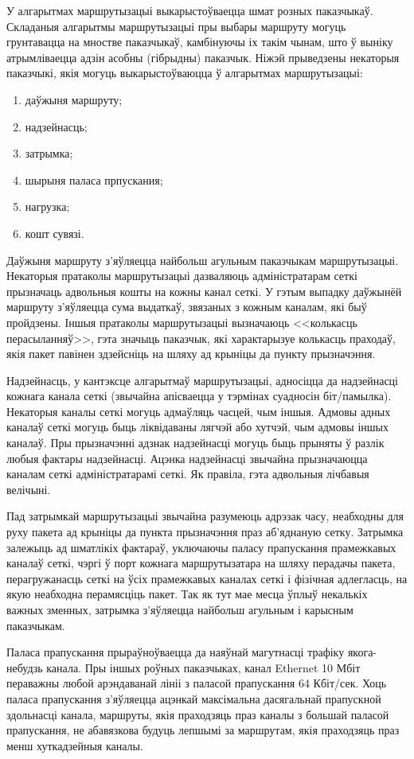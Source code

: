У алгарытмах маршрутызацыі выкарыстоўваецца шмат розных паказчыкаў. Складаныя алгарытмы маршрутызацыі пры выбары маршруту могуць грунтавацца на мностве паказчыкаў, камбінуючы іх такім чынам, што ў выніку атрымліваецца адзін асобны (гібрыдны) паказчык. Ніжэй прыведзены некаторыя паказчыкі, якія могуць выкарыстоўваюцца ў алгарытмах маршрутызацыі:
\begin{enumerate}
    \item даўжыня маршруту;
    \item надзейнасць;
    \item затрымка;
    \item шырыня паласа прпускания;
    \item нагрузка;
    \item кошт сувязі.
\end{enumerate}

Даўжыня маршруту з'яўляецца найбольш агульным паказчыкам маршрутызацыі. Некаторыя пратаколы маршрутызацыі дазваляюць адміністратарам сеткі прызначаць адвольныя кошты на кожны канал сеткі. У гэтым выпадку даўжынёй маршруту з'яўляецца сума выдаткаў, звязаных з кожным каналам, які быў пройдзены. Іншыя пратаколы маршрутызацыі вызначаюць <<колькасць перасыланняў>>, гэта значыць паказчык, які характарызуе колькасць праходаў, якія пакет павінен здзейсніць на шляху ад крыніцы да пункту прызначэння.

Надзейнасць, у кантэксце алгарытмаў маршрутызацыі, адносіцца да надзейнасці кожнага канала сеткі (звычайна апісваецца у тэрмінах суадносін біт/памылка). Некаторыя каналы сеткі могуць адмаўляць часцей, чым іншыя. Адмовы адных каналаў сеткі могуць быць ліквідаваны лягчэй або хутчэй, чым адмовы іншых каналаў. Пры прызначэнні адзнак надзейнасці могуць быць прыняты ў разлік любыя фактары надзейнасці. Ацэнка надзейнасці звычайна прызначаюцца каналам сеткі адміністратарамі сеткі. Як правіла, гэта адвольныя лічбавыя велічыні.

Пад затрымкай маршрутызацыі звычайна разумеюць адрэзак часу, неабходны для руху пакета ад крыніцы да пункта прызначэння праз аб'яднаную сетку. Затрымка залежыць ад шматлікіх фактараў, уключаючы паласу прапускання прамежкавых каналаў сеткі, чэргі ў порт кожнага
маршрутызатара на шляху перадачы пакета, перагружанасць сеткі на ўсіх прамежкавых каналах сеткі і фізічная адлегласць, на якую неабходна перамясціць пакет. Так як тут мае месца ўплыў некалькіх важных зменных, затрымка з'яўляецца найбольш агульным і карысным паказчыкам.

Паласа прапускання прыраўноўваецца да наяўнай магутнасці трафіку якога-небудзь канала. Пры іншых роўных паказчыках, канал Ethernet 10 Мбіт пераважны любой арэндаванай лініі з паласой прапускання 64 Кбіт/сек. Хоць паласа прапускання з'яўляецца ацэнкай максімальна дасягальнай прапускной здольнасці канала, маршруты, якія праходзяць праз каналы з большай паласой прапускання, не абавязкова будуць лепшымі за маршрутам, якія праходзяць праз менш хуткадзейныя каналы.

